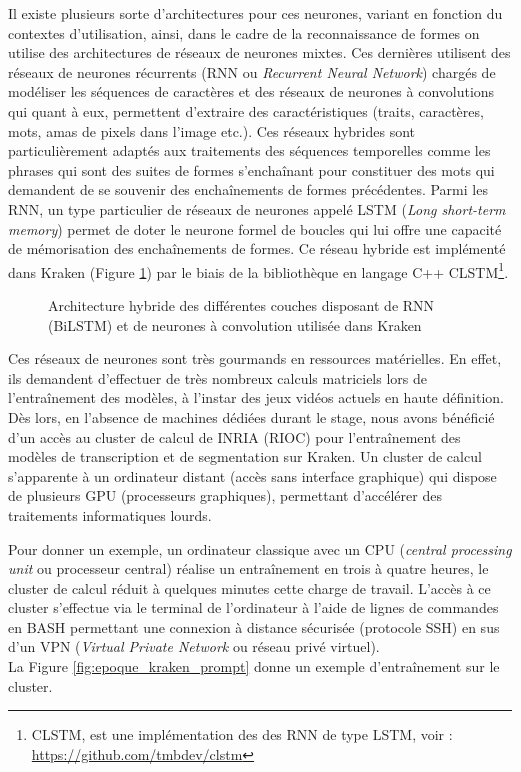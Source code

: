 Il existe plusieurs sorte d'architectures pour ces neurones, variant en fonction du contextes d'utilisation, ainsi, dans le cadre de la reconnaissance de formes on utilise des architectures de réseaux de neurones mixtes. Ces dernières utilisent des réseaux de neurones récurrents (RNN ou \textit{Recurrent Neural Network}) chargés de modéliser les séquences de caractères et des réseaux de neurones à convolutions qui quant à eux, permettent d'extraire des caractéristiques (traits, caractères, mots, amas de pixels dans l'image etc.). Ces réseaux hybrides sont particulièrement adaptés aux traitements des séquences temporelles comme les phrases qui sont des suites de formes s'enchaînant pour constituer des mots qui demandent de se souvenir des enchaînements de formes précédentes. Parmi les RNN, un type particulier de réseaux de neurones appelé LSTM (\textit{Long short-term memory}) permet de doter le neurone formel de boucles qui lui offre une capacité de mémorisation des enchaînements de formes. Ce réseau hybride est implémenté dans Kraken (Figure \ref{fig:graph_neurones_artificiels}) par le biais de la bibliothèque en langage C++ CLSTM\footnote{CLSTM, est une implémentation des des RNN de type LSTM, voir : \url{https://github.com/tmbdev/clstm}}. 
\begin{figure}[h!]
    \centering
    \centerline{}
    \caption{Architecture hybride des différentes couches disposant de RNN (BiLSTM) et de neurones à convolution utilisée dans Kraken \textcopyright \cite{kiessling_kraken_2019}}
    \label{fig:graph_neurones_artificiels}
\end{figure}
\newpage
Ces réseaux de neurones sont très gourmands en ressources matérielles. En effet, ils demandent d'effectuer de très nombreux calculs matriciels lors de l'entraînement des modèles, à l'instar des jeux vidéos actuels en haute définition. Dès lors, en l'absence de machines dédiées durant le stage, nous avons bénéficié d'un accès au cluster de calcul de INRIA (RIOC) pour l'entraînement des modèles de transcription et de segmentation sur Kraken. Un cluster de calcul s'apparente à un ordinateur distant (accès sans interface graphique) qui dispose de plusieurs GPU (processeurs graphiques), permettant d'accélérer des traitements informatiques lourds. 

Pour donner un exemple, un ordinateur classique avec un CPU (\textit{central processing unit} ou processeur central) réalise un entraînement en trois à quatre heures, le cluster de calcul réduit à quelques minutes cette charge de travail. L'accès à ce cluster s'effectue via le terminal de l'ordinateur à l'aide de lignes de commandes en BASH permettant une connexion à distance sécurisée (protocole SSH) en sus d'un VPN (\textit{Virtual Private Network} ou réseau privé virtuel).\\ La Figure \ref{fig:epoque_kraken_prompt} donne un exemple d'entraînement sur le cluster.
\newpage
